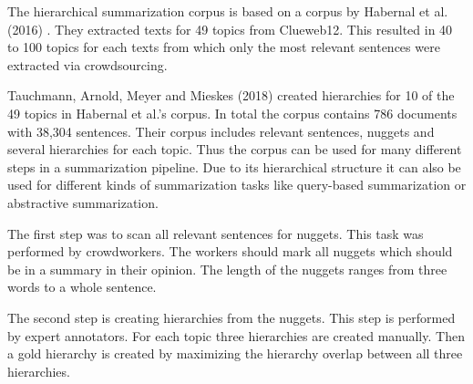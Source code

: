  
The hierarchical summarization corpus is based on a corpus by Habernal et al. (2016) \citep{Habernal:2016:NCA:2911451.2914682}. They extracted texts for 49 topics from Clueweb12. This resulted in 40 to 100 topics for each texts from which only the most relevant sentences were extracted via crowdsourcing.

Tauchmann, Arnold, Meyer and Mieskes (2018) created hierarchies for 10 of the 49 topics in Habernal et al.'s corpus. In total the corpus contains 786 documents with 38,304 sentences. Their corpus includes relevant sentences, nuggets and several hierarchies for each topic. Thus the corpus can be used for many different steps in a summarization pipeline. Due to its hierarchical structure it can also be used for different kinds of summarization tasks like query-based summarization or abstractive summarization.

The first step was to scan all relevant sentences for nuggets. This task was performed by crowdworkers. The workers should mark all nuggets which should be in a summary in their opinion. The length of the nuggets ranges from three words to a whole sentence.

The second step is creating hierarchies from the nuggets. This step is performed by expert annotators. For each topic three hierarchies are created manually. Then a gold hierarchy is created by maximizing the hierarchy overlap between all three hierarchies.